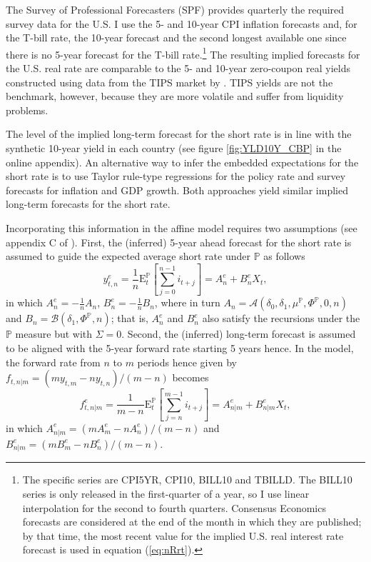 \documentclass[a4paper, 12pt]{article}
\providecommand{\tnr}{n}
\providecommand{\tnrfwd}{m}
\providecommand{\idxt}{t}
\providecommand{\idxs}{\idxt,\tnr}
\providecommand{\idxsfwd}{\tnr | \tnrfwd}
\providecommand{\idxsfwdt}{\idxt,\idxsfwd}
\providecommand{\yld}{y}
\providecommand{\xpc}{e}
\providecommand{\yZero}{\yld_{\idxs}}
\providecommand{\yZeroE}{\yZero^{\xpc}}
\providecommand{\yZeroFwd}{\frate_{\idxsfwdt}}
\providecommand{\yZeroEfwd}{\yZeroFwd^{\xpc}}
\providecommand{\srate}{i}
\providecommand{\frate}{f}
\providecommand{\Xvars}{X_{\idxt}}
\providecommand{\affineA}{A_{\tnr}}
\providecommand{\affineB}{B_{\tnr}}
\providecommand{\affineAe}{\affineA^{\xpc}}
\providecommand{\affineBe}{\affineB^{\xpc}}
\providecommand{\affineAeFwd}{A_{\idxsfwd}^{\xpc}}
\providecommand{\affineBeFwd}{B_{\idxsfwd}^{\xpc}}
\providecommand{\Pmeasure}{\mathbb{P}}
\providecommand{\ExpP}{\mathrm{E}^{\Pmeasure}_{t}}
\providecommand{\deltazero}{\delta_{0}}
\providecommand{\deltaone}{\delta_{1}}
\providecommand{\XmuP}{\mu^{\Pmeasure}}
\providecommand{\XSigma}{\Sigma}
\providecommand{\XPhiP}{\Phi^{\Pmeasure}}
\newcommand{\eqyFwd}{\yZeroFwd = \left( \tnrfwd \yld_{\idxt,\tnrfwd} - \tnr \yZero \right)/ \left( \tnrfwd - \tnr \right) }
\newcommand{\eqAeFwd}{\affineAeFwd = \left( \tnrfwd A_{\tnrfwd}^{\xpc}  - \tnr \affineAe \right)/ \left( \tnrfwd - \tnr \right) }
\newcommand{\eqBeFwd}{\affineBeFwd = \left( \tnrfwd B_{\tnrfwd}^{\xpc}  - \tnr \affineBe \right)/ \left( \tnrfwd - \tnr \right) }
\begin{document}
The Survey of Professional Forecasters (SPF) provides quarterly the required survey data for the U.S. I use the 5- and 10-year CPI inflation forecasts and, for the T-bill rate, the 10-year forecast and the second longest available one since there is no 5-year forecast for the T-bill rate.\footnote{ The specific series are CPI5YR, CPI10, BILL10 and TBILLD. The BILL10 series is only released in the first-quarter of a year, so I use linear interpolation for the second to fourth quarters. Consensus Economics forecasts are considered at the end of the month in which they are published; by that time, the most recent value for the implied U.S. real interest rate forecast is used in equation (\ref{eq:nRrt}).} The resulting implied forecasts for the U.S. real rate are comparable to the 5- and 10-year zero-coupon real yields constructed using data from the TIPS market by \cite{GSW:2010}. TIPS yields are not the benchmark, however, because they are more volatile and suffer from liquidity problems. 

The level of the implied long-term forecast for the short rate is in line with the synthetic 10-year yield in each country (see figure \ref{fig:YLD10Y_CBP} in the online appendix). An alternative way to infer the embedded expectations for the short rate is to use Taylor rule-type regressions for the policy rate and survey forecasts for inflation and GDP growth. Both approaches yield similar implied long-term forecasts for the short rate. 

Incorporating this information in the affine model requires two assumptions (see appendix C of \cite{Guimaraes:2014}). First, the (inferred) 5-year ahead forecast for the short rate is assumed to guide the expected average short rate under \(\Pmeasure\) as follows 
\begin{equation*}
\yZeroE = \frac{1}{\tnr} \ExpP \left[ \sum_{j=0} ^{\tnr-1} \srate_{\idxt+j} \right] = \affineAe + \affineBe \Xvars,
\end{equation*}
in which \(\affineAe = - \frac{1}{\tnr} \affineA\), \(\affineBe = - \frac{1}{\tnr} \affineB\), where in turn \(\affineA = \mathcal{A}(\deltazero, \deltaone, \XmuP, \XPhiP, 0, \tnr)\) and \(\affineB = \mathcal{B}(\deltaone, \XPhiP, \tnr)\); that is, \(\affineAe\) and \(\affineBe\) also satisfy the recursions under the \(\Pmeasure\) measure but with \(\XSigma = 0\). Second, the (inferred) long-term forecast is assumed to be aligned with the 5-year forward rate starting 5 years hence. In the model, the forward rate from \(\tnr\) to \(\tnrfwd\) periods hence given by \(\eqyFwd\) becomes 
\begin{equation*}
\yZeroEfwd = \frac{1}{\tnrfwd - \tnr} \ExpP \left[ \sum_{j = \tnr} ^{\tnrfwd-1} \srate_{\idxt+j} \right] = \affineAeFwd + \affineBeFwd \Xvars ,
\end{equation*}
in which \(\eqAeFwd\)  and \(\eqBeFwd\). 
\end{document}
